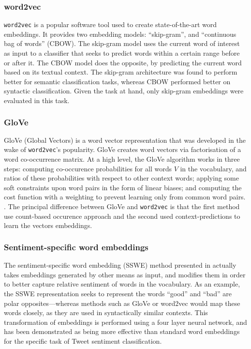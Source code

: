 \subsubsection{word2vec}
\texttt{word2vec} is a popular software tool used to create state-of-the-art word embeddings. \cite{mikolov2013distributed} It provides two embedding models: ``skip-gram'', and ``continuous bag of words'' (CBOW). The skip-gram model uses the current word of interest as input to a classifier that seeks to predict words within a certain range before or after it. The CBOW model does the opposite, by predicting the current word based on its textual context. The skip-gram architecture was found to perform better for semantic classification tasks, whereas CBOW performed better on syntactic classification. \cite{mikolov2013efficient} Given the task at hand, only skip-gram embeddings were evaluated in this task.

\subsubsection{GloVe}
GloVe (Global Vectors) is a word vector representation that was developed in the wake of \texttt{word2vec}'s popularity. GloVe creates word vectors via factorisation of a word co-occurrence matrix. At a high level, the GloVe algorithm works in three steps: computing co-occurence probabilities for all words $V$ in the vocabulary, and ratios of these probabilities with respect to other context words; applying some soft constraints upon word pairs in the form of linear biases; and computing the cost function with a weighting to prevent learning only from common word pairs. \cite{pennington2014glove}. The principal difference between GloVe and \texttt{word2vec} is that the first method use count-based occurence approach and the second used context-predictions to learn the vectors embeddings. 

\subsubsection{Sentiment-specific word embeddings}
The sentiment-specific word embedding (SSWE) method presented in \cite{tang2014learning} actually takes embeddings generated by other means as input, and modifies them in order to better capture relative sentiment of words in the vocabulary. As an example, the SSWE representation seeks to represent the words ``good'' and ``bad'' are polar opposites---whereas methods such as GloVe or word2vec would map these words closely, as they are used in syntactically similar contexts. This transformation of embeddings is performed using a four layer neural network, and has been demonstrated as being more effective than standard word embeddings for the specific task of Tweet sentiment classification.

